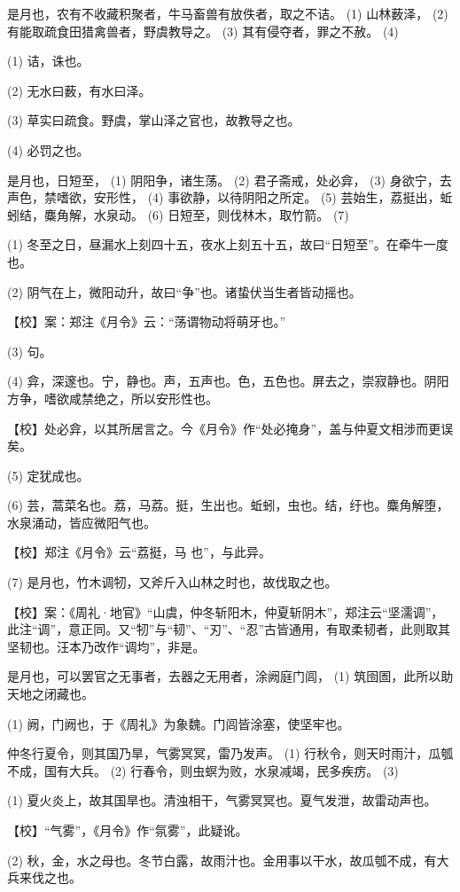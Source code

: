 \documentclass[12pt,UTF8]{ctexbook}
\begin{document}
是月也，农有不收藏积聚者，牛马畜兽有放佚者，取之不诘。 (1) 山林薮泽， (2) 有能取疏食田猎禽兽者，野虞教导之。 (3) 其有侵夺者，罪之不赦。 (4)

(1) 诘，诛也。

(2) 无水曰薮，有水曰泽。

(3) 草实曰疏食。野虞，掌山泽之官也，故教导之也。

(4) 必罚之也。

是月也，日短至， (1) 阴阳争，诸生荡。 (2) 君子斋戒，处必弇， (3) 身欲宁，去声色，禁嗜欲，安形性， (4) 事欲静，以待阴阳之所定。 (5) 芸始生，荔挺出，蚯蚓结，麋角解，水泉动。 (6) 日短至，则伐林木，取竹箭。 (7)

(1) 冬至之日，昼漏水上刻四十五，夜水上刻五十五，故曰“日短至”。在牵牛一度也。

(2) 阴气在上，微阳动升，故曰“争”也。诸蛰伏当生者皆动摇也。

【校】案：郑注《月令》云：“荡谓物动将萌牙也。”

(3) 句。

(4) 弇，深邃也。宁，静也。声，五声也。色，五色也。屏去之，崇寂静也。阴阳方争，嗜欲咸禁绝之，所以安形性也。

【校】处必弇，以其所居言之。今《月令》作“处必掩身”，盖与仲夏文相涉而更误矣。

(5) 定犹成也。

(6) 芸，蒿菜名也。荔，马荔。挺，生出也。蚯蚓，虫也。结，纡也。麋角解堕，水泉涌动，皆应微阳气也。

【校】郑注《月令》云“荔挺，马 也”，与此异。

(7) 是月也，竹木调牣，又斧斤入山林之时也，故伐取之也。

【校】案：《周礼·地官》“山虞，仲冬斩阳木，仲夏斩阴木”，郑注云“坚濡调”，此注“调”，意正同。又“牣”与“韧”、“刃”、“忍”古皆通用，有取柔韧者，此则取其坚韧也。汪本乃改作“调均”，非是。

是月也，可以罢官之无事者，去器之无用者，涂阙庭门闾， (1) 筑囹圄，此所以助天地之闭藏也。

(1) 阙，门阙也，于《周礼》为象魏。门闾皆涂塞，使坚牢也。

仲冬行夏令，则其国乃旱，气雾冥冥，雷乃发声。 (1) 行秋令，则天时雨汁，瓜瓠不成，国有大兵。 (2) 行春令，则虫螟为败，水泉减竭，民多疾疠。 (3)

(1) 夏火炎上，故其国旱也。清浊相干，气雾冥冥也。夏气发泄，故雷动声也。

【校】“气雾”，《月令》作“氛雾”，此疑讹。

(2) 秋，金，水之母也。冬节白露，故雨汁也。金用事以干水，故瓜瓠不成，有大兵来伐之也。
\end{document}
